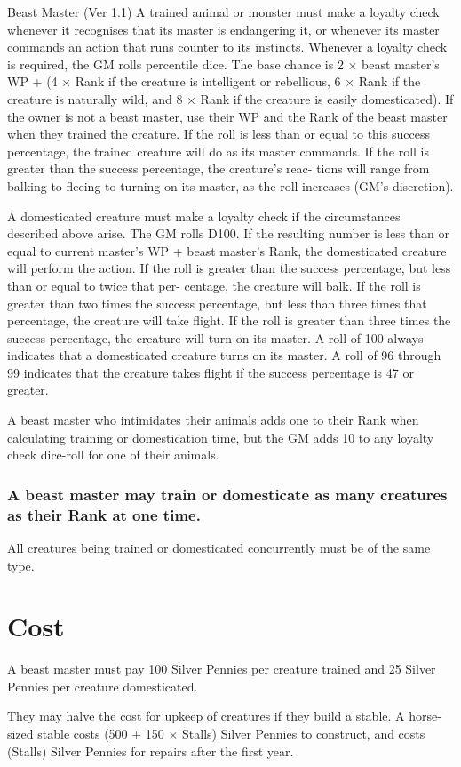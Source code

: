 \begin{Chapter}{Beast Master (Ver 1.1)}
A trained animal or monster must make a loyalty check whenever it
recognises that its master is endangering it, or whenever its master
commands an action that runs counter to its instincts.  Whenever a
loyalty check is required, the GM rolls percentile dice.  The base
chance is 2 × beast master’s WP + (4 × Rank if the creature is
intelligent or rebellious, 6 × Rank if the creature is naturally wild,
and 8 × Rank if the creature is easily domesticated).  If the owner is
not a beast master, use their WP and the Rank of the beast master when
they trained the creature. If the roll is less than or equal to this
success percentage, the trained creature will do as its master
commands.  If the roll is greater than the success percentage, the
creature’s reac- tions will range from balking to fleeing to turning
on its master, as the roll increases (GM’s discretion).

A domesticated creature must make a loyalty check if the circumstances
described above arise.  The GM rolls D100. If the resulting number is
less than or equal to current master’s WP + beast master’s Rank, the
domesticated creature will perform the action.  If the roll is greater
than the success percentage, but less than or equal to twice that per-
centage, the creature will balk. If the roll is greater than two times
the success percentage, but less than three times that percentage, the
creature will take flight. If the roll is greater than three times the
success percentage, the creature will turn on its master.  A roll of
100 always indicates that a domesticated creature turns on its
master. A roll of 96 through 99 indicates that the creature takes
flight if the success percentage is 47 or greater.

A beast master who intimidates their animals adds one to their Rank
when calculating training or domestication time, but the GM adds 10 to
any loyalty check dice-roll for one of their animals.

\subsubsection{A beast master may train or domesticate as many creatures as their
Rank at one time.}

All creatures being trained or domesticated concurrently must be of
the same type.

\section{Cost}

A beast master must pay 100 Silver Pennies per creature trained and 25
Silver Pennies per creature domesticated.

They may halve the cost for upkeep of creatures if they build a
stable.  A horse-sized stable costs (500 + 150 × Stalls) Silver
Pennies to construct, and costs (Stalls) Silver Pennies for repairs
after the first year.

\end{Chapter}
